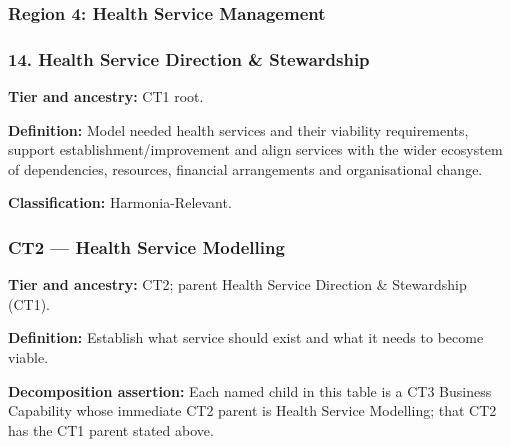 \label{rad:business:860}

\par\smallskip
{}\label{rad:business:862}
\subsubsection*{Region 4: Health Service Management}
\label{rad:business:864}
\subsubsection*{14. Health Service Direction \& Stewardship}
\label{rad:business:866}

\textbf{Tier and ancestry:} CT1 root.

\label{rad:business:868}

\textbf{Definition:} Model needed health services and their viability requirements, support establishment/\allowbreak{}improvement and align services with the wider ecosystem of dependencies, resources, financial arrangements and organisational change.

\label{rad:business:870}

\textbf{Classification:} Harmonia-Relevant.

\label{rad:business:872}
\subsubsection*{CT2 — Health Service Modelling}
\label{rad:business:874}

\textbf{Tier and ancestry:} CT2; parent Health Service Direction \& Stewardship (CT1).

\label{rad:business:876}

\textbf{Definition:} Establish what service should exist and what it needs to become viable.

\label{rad:business:878}

\textbf{Decomposition assertion:} Each named child in this table is a CT3 Business Capability whose immediate CT2 parent is Health Service Modelling; that CT2 has the CT1 parent stated above.

